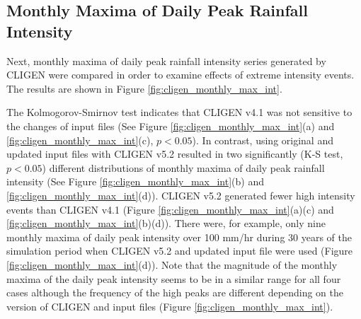 \subsection{Monthly Maxima of Daily Peak Rainfall Intensity}
Next, monthly maxima of daily peak rainfall intensity series generated by CLIGEN
were compared in order to examine effects of extreme intensity events. The
results are shown in Figure \ref{fig:cligen_monthly_max_int}.

The Kolmogorov-Smirnov test indicates that CLIGEN v4.1 was not sensitive to the
changes of input files (See Figure \ref{fig:cligen_monthly_max_int}(a) and
\ref{fig:cligen_monthly_max_int}(c), $p<0.05$). In contrast, using original and
updated input files with CLIGEN v5.2 resulted in two significantly (K-S test,
$p<0.05$) different distributions of monthly maxima of daily peak rainfall
intensity (See Figure \ref{fig:cligen_monthly_max_int}(b) and
\ref{fig:cligen_monthly_max_int}(d)).
CLIGEN v5.2 generated fewer high intensity events than CLIGEN v4.1 (Figure
\ref{fig:cligen_monthly_max_int}(a)(c) and
\ref{fig:cligen_monthly_max_int}(b)(d)). There were, for example, only nine
monthly maxima of daily peak intensity over 100 mm/hr during 30 years of the
simulation period when CLIGEN v5.2 and updated input file were used (Figure
\ref{fig:cligen_monthly_max_int}(d)). Note that the magnitude of the monthly
maxima of the daily peak intensity seems to be in a similar range for all four
cases although the frequency of the high peaks are different depending on the
version of CLIGEN and input files (Figure \ref{fig:cligen_monthly_max_int}).

